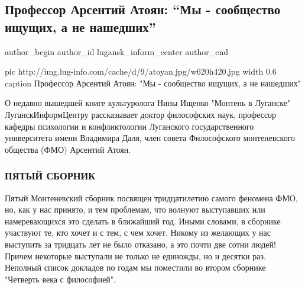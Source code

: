  
 
 
 
 
 
\subsection{Профессор Арсентий Атоян: \enquote{Мы - сообщество ищущих, а не нашедших}}
\label{sec:22_11_2020.news.lnr.lug_info.lugansk_inform_center.1.professor_atojan}
\ifcmt
	author_begin
   author_id lugansk_inform_center
	author_end
\fi

\ifcmt
  pic http://img.lug-info.com/cache/d/9/atoyan.jpg/w620h420.jpg
  width 0.6
	caption Профессор Арсентий Атоян: "Мы - сообщество ищущих, а не нашедших"
\fi


О недавно вышедшей книге культуролога Нины Ищенко "Монтень в Луганске"
ЛуганскИнформЦентру рассказывает доктор философских наук, профессор кафедры
психологии и конфликтологии Луганского государственного университета имени
Владимира Даля, член совета Философского монтеневского общества (ФМО) Арсентий
Атоян.

\subsubsection{ПЯТЫЙ СБОРНИК}

Пятый Монтеневский сборник посвящен тридцатилетию самого феномена ФМО, но,
как у нас принято, и тем проблемам, что волнуют выступавших или
намеревающихся это сделать в ближайший год. Иными словами, в сборнике
участвуют те, кто хочет и с тем, с чем хочет. Никому из желающих у нас
выступить за тридцать лет не было отказано, а это почти две сотни людей!
Причем некоторые выступали не только не единожды, но и десятки раз.
Неполный список докладов по годам мы поместили во втором сборнике
"Четверть века с философией".

